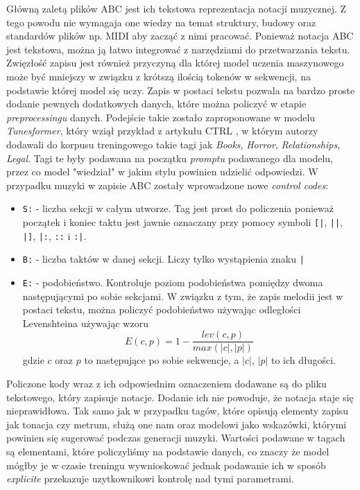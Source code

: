 \documentclass[data-science]{agh-wi} %
\begin{document}
Główną zaletą plików ABC jest ich tekstowa reprezentacja notacji muzycznej. Z tego powodu nie wymagaja one wiedzy na temat struktury, budowy oraz standardów plików np. MIDI aby zacząć z nimi pracować. Ponieważ notacja ABC jest tekstowa, można ją łatwo integrować z narzędziami do przetwarzania tekstu. Zwięzłość zapisu jest również przyczyną dla której model uczenia maszynowego może być mniejszy w związku z krótszą ilością tokenów w sekwencji, na podstawie której model się uczy. Zapis w postaci tekstu pozwala na bardzo proste dodanie pewnych dodatkowych danych, które można policzyć w etapie \textit{preprocessingu} danych. Podejście takie zostało zaproponowane w modelu \textit{Tunesformer}\cite{tunesformer}, który wziął przykład z artykułu CTRL \cite{keskarCTRL2019}, w którym autorzy dodawali do korpusu treningowego takie tagi jak \textit{Books}, \textit{Horror}, \textit{Relationships}, \textit{Legal}. Tagi te były podawana na początku \textit{promptu} podawanego dla modelu, przez co model "wiedział" w jakim stylu powinien udzielić odpowiedzi. W przypadku muzyki w zapisie ABC zostały wprowadzone nowe \textit{control codes}:
\begin{itemize}
    \item \texttt{S:} - liczba sekcji w całym utworze. Tag jest prost do policzenia ponieważ początek i koniec taktu jest jawnie oznaczany przy pomocy symboli \texttt{[|}, \texttt{||}, \texttt{|]}, \texttt{|:}, \texttt{::} i \texttt{:|}.
    \item \texttt{B:} - liczba taktów w danej sekcji. Liczy tylko wystąpienia znaku \texttt{|}
    \item \texttt{E:} - podobieństwo. Kontroluje poziom podobieństwa pomiędzy dwoma następującymi po sobie sekcjami. W związku z tym, że zapis melodii jest w postaci tekstu, można policzyć podobieństwo używając odległości Levenshteina używając wzoru
          \begin{equation}
              E(c,p) = 1 - \dfrac{lev(c, p)}{max(|c|, |p|)}
          \end{equation}
          gdzie $c$ oraz $p$ to następujące po sobie sekwencje, a $|c|$, $|p|$ to ich długości.
\end{itemize}

Policzone kody wraz z ich odpowiednim oznaczeniem dodawane są do pliku tekstowego, który zapisuje notacje. Dodanie ich nie powoduje, że notacja staje się nieprawidłowa. Tak samo jak w przypadku tagów, które opisują elementy zapisu jak tonacja czy metrum, służą one nam oraz modelowi jako wskazówki, którymi powinien się sugerować podczas generacji muzyki. Wartości podawane w tagach są elementami, które policzyliśmy na podstawie danych, co znaczy że model mógłby je w czasie treningu wywnioskować jednak podawanie ich w sposób \textit{explicite} przekazuje uzytkownikowi kontrolę nad tymi parametrami.
\end{document}
